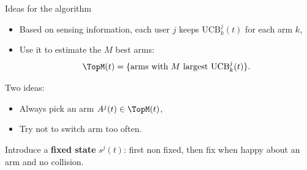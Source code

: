 \documentclass[12pt,english,ignorenonframetext,aspectratio=169,]{beamer}
\providecommand{\tightlist}{%
  \setlength{\itemsep}{0pt}\setlength{\parskip}{0pt}}
\begin{document}
\begin{frame}{Ideas for the \MCTopM{} algorithm}

\begin{itemize}\tightlist
\item
  Based on sensing information, each user \(j\) keeps \(\mathrm{UCB}_k^j(t)\) for each arm \(k\),
\item
  Use it to estimate the \(M\) best arms:
  \[\TopM(t) = \{\text{arms with } M \text{ largest } \mathrm{UCB}_k^j(t)\}.\]
\end{itemize}

Two ideas:
\begin{itemize}\tightlist
  \item
  Always pick an arm \(A^j(t) \in \TopM(t)\),
  \item
  Try not to switch arm too often.
\end{itemize}

Introduce a \textbf{fixed state} \(s^j(t)\):
\newline
first non fixed, then fix when happy about an arm and no collision.

\end{frame}
\end{document}
